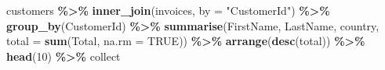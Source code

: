 \documentclass[
]{book}
\newenvironment{Shaded}{\begin{snugshade}}{\end{snugshade}}
\newcommand{\AttributeTok}[1]{\textcolor[rgb]{0.13,0.29,0.53}{#1}}
\newcommand{\ConstantTok}[1]{\textcolor[rgb]{0.56,0.35,0.01}{#1}}
\newcommand{\DecValTok}[1]{\textcolor[rgb]{0.00,0.00,0.81}{#1}}
\newcommand{\FunctionTok}[1]{\textcolor[rgb]{0.13,0.29,0.53}{\textbf{#1}}}
\newcommand{\NormalTok}[1]{#1}
\newcommand{\SpecialCharTok}[1]{\textcolor[rgb]{0.81,0.36,0.00}{\textbf{#1}}}
\newcommand{\StringTok}[1]{\textcolor[rgb]{0.31,0.60,0.02}{#1}}
\theoremstyle{break}
\theoremstyle{nonumberplain}
\begin{document}
\begin{Shaded}
\begin{Highlighting}[]
\NormalTok{customers }\SpecialCharTok{\%\textgreater{}\%} \FunctionTok{inner\_join}\NormalTok{(invoices, }\AttributeTok{by =} \StringTok{"CustomerId"}\NormalTok{) }\SpecialCharTok{\%\textgreater{}\%} \FunctionTok{group\_by}\NormalTok{(CustomerId) }\SpecialCharTok{\%\textgreater{}\%} 
    \FunctionTok{summarise}\NormalTok{(FirstName, LastName, country, }\AttributeTok{total =} \FunctionTok{sum}\NormalTok{(Total, }\AttributeTok{na.rm =} \ConstantTok{TRUE}\NormalTok{)) }\SpecialCharTok{\%\textgreater{}\%}  
    \FunctionTok{arrange}\NormalTok{(}\FunctionTok{desc}\NormalTok{(total)) }\SpecialCharTok{\%\textgreater{}\%} \FunctionTok{head}\NormalTok{(}\DecValTok{10}\NormalTok{) }\SpecialCharTok{\%\textgreater{}\%}\NormalTok{ collect}
\end{Highlighting}
\end{Shaded}
\end{document}
